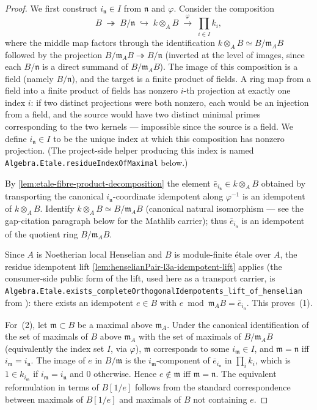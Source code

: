 \begin{proof}
\leanok
We first construct $i_{\mathfrak n} \in I$ from $\mathfrak n$ and
$\varphi$. Consider the composition
\[
  B \;\twoheadrightarrow\; B/\mathfrak n
   \;\hookrightarrow\; k \otimes_A B
   \;\xrightarrow{\,\varphi\,}\; \prod_{i \in I} k_i,
\]
where the middle map factors through the identification
$k \otimes_A B \simeq B/\mathfrak m_A B$ followed by the
projection $B/\mathfrak m_A B \twoheadrightarrow B/\mathfrak n$
(inverted at the level of images, since each $B/\mathfrak n$ is a
direct summand of $B/\mathfrak m_A B$). The image of this
composition is a field (namely $B/\mathfrak n$), and the target
is a finite product of fields. A ring map from a field into a
finite product of fields has nonzero $i$-th projection at exactly
one index $i$: if two distinct projections were both nonzero,
each would be an injection from a field, and the source would
have two distinct minimal primes corresponding to the two
kernels — impossible since the source is a field. We define
$i_{\mathfrak n} \in I$ to be the unique index at which this
composition has nonzero projection. (The project-side helper
producing this index is named
\texttt{Algebra.Etale.residueIndexOfMaximal} below.)

By \cref{lem:etale-fibre-product-decomposition} the element
$\bar e_{i_{\mathfrak n}} \in k \otimes_A B$ obtained by
transporting the canonical $i_{\mathfrak n}$-coordinate idempotent
along $\varphi^{-1}$ is an idempotent of $k \otimes_A B$. Identify
$k \otimes_A B \simeq B/\mathfrak m_A B$ (canonical natural
isomorphism — see the gap-citation paragraph below for the
Mathlib carrier); thus $\bar e_{i_{\mathfrak n}}$ is an
idempotent of the quotient ring $B / \mathfrak m_A B$.

Since $A$ is Noetherian local Henselian and $B$ is module-finite
étale over $A$, the residue idempotent lift
\cref{lem:henselianPair-l3a-idempotent-lift} applies (the
consumer-side public form of the lift, used here as a transport
carrier, is
\texttt{Algebra.Etale.exists\_completeOrthogonalIdempotents\_lift\_of\_henselian}
from ):
there exists an idempotent $e \in B$ with $e \bmod \mathfrak m_A B
= \bar e_{i_{\mathfrak n}}$. This proves~(1).

For~(2), let $\mathfrak m \subset B$ be a maximal above
$\mathfrak m_A$. Under the canonical identification of the set
of maximals of $B$ above $\mathfrak m_A$ with the set of maximals
of $B/\mathfrak m_A B$ (equivalently the index set $I$, via
$\varphi$), $\mathfrak m$ corresponds to some
$i_{\mathfrak m} \in I$, and $\mathfrak m = \mathfrak n$ iff
$i_{\mathfrak m} = i_{\mathfrak n}$. The image of $e$ in
$B/\mathfrak m$ is the $i_{\mathfrak m}$-component of
$\bar e_{i_{\mathfrak n}}$ in $\prod_i k_i$, which is $1 \in
k_{i_{\mathfrak m}}$ if $i_{\mathfrak m} = i_{\mathfrak n}$ and
$0$ otherwise. Hence $e \notin \mathfrak m$ iff $\mathfrak m =
\mathfrak n$. The equivalent reformulation in terms of $B[1/e]$
follows from the standard correspondence between maximals of
$B[1/e]$ and maximals of $B$ not containing $e$.


\end{proof}

